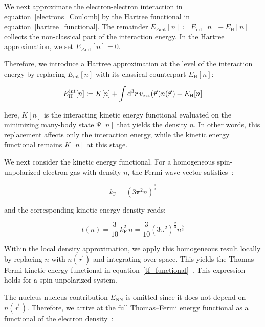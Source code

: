 We next approximate the electron-electron interaction in equation~\eqref{electrons_Coulomb} by the Hartree functional in equation~\eqref{hartree_functional}.
The remainder $E_{\Delta\mathrm{int}}[n]\coloneqq E_\mathrm{int}[n]-E_\mathrm{H}[n]$ collects the non-classical part of the interaction energy.
In the Hartree approximation, we set $E_{\Delta\mathrm{int}}[n]=0$.

Therefore, we introduce a Hartree approximation at the level of the interaction energy by replacing $E_\mathrm{int}[n]$ with its classical counterpart $E_\mathrm{H}[n]$:

\begin{equation}
    E_\mathrm{H}^{\mathrm{int}}[n]
    \coloneqq K[n]
    + \int \mathrm{d}^3{r}\,v_\mathrm{ext}(\vec{r}\,)n(\vec{r}\,)
    + E_\mathrm{H}[n]
\label{hartree_interaction_level_energy}
\end{equation}

here, $K[n]$ is the interacting kinetic energy functional evaluated on the minimizing many-body state $\Psi[n]$ that yields the density $n$.
In other words, this replacement affects only the interaction energy, while the kinetic energy functional remains $K[n]$ at this stage.

We next consider the kinetic energy functional.
For a homogeneous spin-unpolarized electron gas with density $n$,
the Fermi wave vector satisfies~\cite{simon2013oxford}:

\begin{equation}
    k_\mathrm{F} = \left(3\mathrm{\pi}^2 n\right)^{\frac{1}{3}}
\label{Fermi_wave_vector_homogeneous_gas}
\end{equation}

and the corresponding kinetic energy density reads:

\begin{equation}
    t(n) = \frac{3}{10}\,k_\mathrm{F}^2\,n
    = \frac{3}{10}\left(3\mathrm{\pi}^2\right)^{\frac{2}{3}}n^{\frac{5}{3}}
\label{kinetic_energy_density_homogeneous_gas}
\end{equation}

Within the local density approximation,
we apply this homogeneous result locally by replacing $n$ with $n(\vec{r}\,)$ and integrating over space.
This yields the Thomas--Fermi kinetic energy functional in equation~\eqref{tf_functional}~\cite{thomas1927calculation,fermi1927metodo,mi2023orbital}.
This expression holds for a spin-unpolarized system.

The nucleus-nucleus contribution $E_\mathrm{NN}$ is omitted since it does not depend on $n(\vec{r}\,)$.
Therefore, we arrive at the full Thomas--Fermi energy functional as a functional of the electron density~\cite{garcia2007efficient,xu2024recent}:

